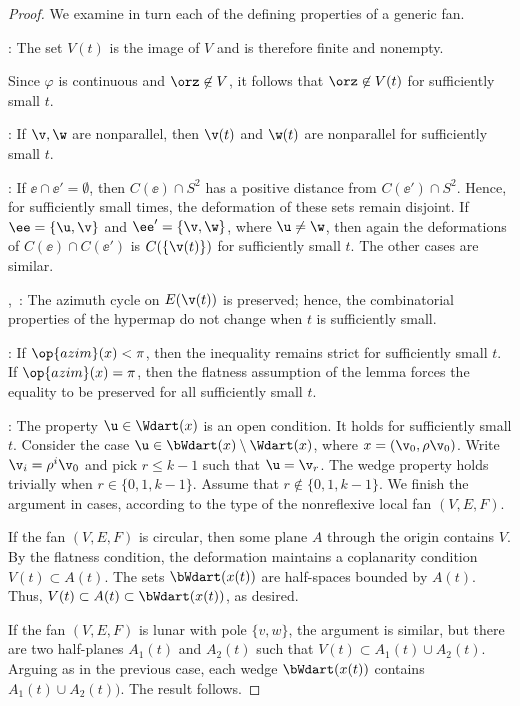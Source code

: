 \begin{proof} We examine in turn each of the defining properties of a generic fan.

: The set $V(t)$ is the image of $V$ and is
therefore finite and nonempty.

 Since $\varphi$ is continuous and
$\orz\not\in V$, it follows that $\orz\not\in V(t)$ for sufficiently
small $t$.

: If $\v,\w$ are nonparallel, then $\v(t)$ and
$\w(t)$ are nonparallel for sufficiently small $t$.

: If $\ee \cap \ee'=\emptyset$, then $C(\ee)\cap
S^2$ has a positive distance from $C(\ee')\cap S^2$.  Hence, for
sufficiently small times, the deformation of these sets remain
disjoint.  If $\ee=\{\u,\v\}$ and $\ee'=\{\v,\w\}$, where $\u\ne\w$,
then again the deformations of $C(\ee)\cap C(\ee')$ is
$C(\{\v(t)\})$ for sufficiently small $t$.  The other cases are
similar.

,~: The azimuth cycle on $E(\v(t))$
is preserved; hence, the combinatorial properties of the hypermap do
not change when $t$ is sufficiently small.

: If $\op{azim}(x)<\pi$, then the inequality remains
strict for sufficiently small $t$.  If $\op{azim}(x)=\pi$, then the
flatness assumption of the lemma forces the equality to be
preserved for all sufficiently small $t$.

: The property $\u\in \Wdart(x)$ is an open condition.
It holds for sufficiently small $t$. Consider the case $\u\in
\bWdart(x)\setminus \Wdart(x)$, where $x= (\v_0,\rho\v_0)$.  Write
$\v_i = \rho^i\v_0$ and pick $r\le k-1$ such that $\u = \v_r$.  The
wedge property holds trivially when $r\in\{0,1,k-1\}$. Assume that
$r\not\in\{0,1,k-1\}$.  We finish the argument in cases, according to 
the type of the nonreflexive local fan  $(V,E,F)$.

If the fan $(V,E,F)$ is circular, then some plane $A$ through
the origin  contains $V$.  By the flatness condition, the
deformation maintains a coplanarity condition $V(t)\subset A(t)$.  The
sets $\bWdart(x(t))$ are half-spaces bounded by $A(t)$.  Thus,
$V(t)\subset A(t)\subset \bWdart(x(t))$, as desired.

If the fan $(V,E,F)$ is lunar with pole $\{v,w\}$, the argument is
similar, but there are two half-planes $A_1(t)$ and $A_2(t)$ such that
$V(t)\subset A_1(t)\cup A_2(t)$.  Arguing as in the previous case,
each wedge $\bWdart(x(t))$ contains $A_1(t)\cup A_2(t))$.  The result
follows.


\end{proof}
